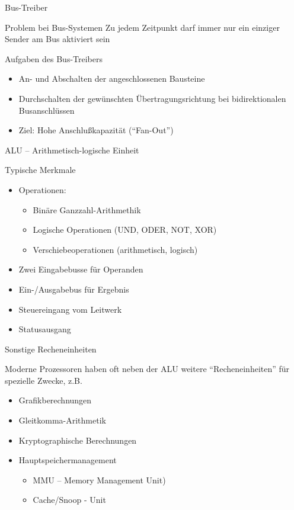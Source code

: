 \documentclass[utf8,9pt]{beamer}
\begin{document}
\begin{frame}{Bus-Treiber}

\begin{block}{Problem bei Bus-Systemen}
Zu jedem Zeitpunkt darf immer nur ein einziger Sender am Bus aktiviert sein
\end{block}

\begin{block}{Aufgaben des Bus-Treibers}
\begin{itemize}
\item An- und Abschalten der angeschlossenen Bausteine
\item Durchschalten der gewünschten Übertragungsrichtung bei bidirektionalen Busanschlüssen
\item Ziel: Hohe Anschlußkapazität ("`Fan-Out"')
\end{itemize}
\end{block}
\end{frame}



\begin{frame}{ALU -- Arithmetisch-logische Einheit}{}
\begin{block}{Typische Merkmale}
\begin{itemize}
\item Operationen:
  \begin{itemize}
  \item Binäre Ganzzahl-Arithmethik
  \item Logische Operationen (UND, ODER, NOT, XOR)
  \item Verschiebeoperationen (arithmetisch, logisch)
  \end{itemize}
\item Zwei Eingabebusse für Operanden
\item Ein-/Ausgabebus für Ergebnis
\item Steuereingang vom Leitwerk
\item Statusausgang
\end{itemize}
\end{block}
\end{frame}

\begin{frame}{Sonstige Recheneinheiten}
\begin{block}{}
Moderne Prozessoren haben oft neben der ALU weitere "`Recheneinheiten"' 
für spezielle Zwecke, z.B.
\begin{itemize}
\item Grafikberechnungen
\item Gleitkomma-Arithmetik
\item Kryptographische Berechnungen
\item Hauptspeichermanagement
  \begin{itemize}
  \item  MMU -- Memory Management Unit)
  \item Cache/Snoop - Unit
  \end{itemize}

\end{itemize}

\end{block}

\end{frame}
\end{document}
